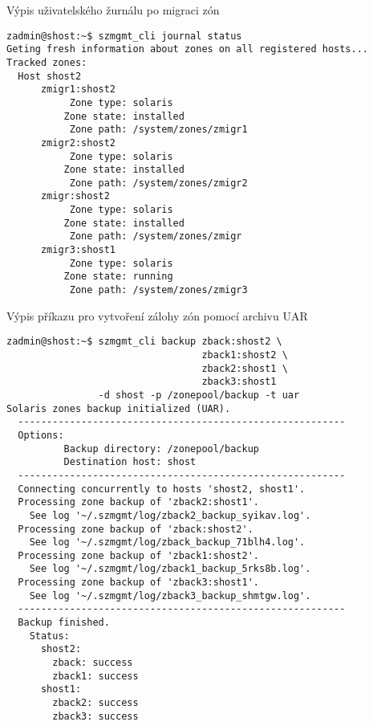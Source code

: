 \begin{listing}[ht]
  \caption{Výpis uživatelského žurnálu po migraci zón}  
  \begin{verbatim}
zadmin@shost:~$ szmgmt_cli journal status
Geting fresh information about zones on all registered hosts...
Tracked zones:  
  Host shost2
      zmigr1:shost2
           Zone type: solaris
          Zone state: installed
           Zone path: /system/zones/zmigr1
      zmigr2:shost2
           Zone type: solaris
          Zone state: installed
           Zone path: /system/zones/zmigr2
      zmigr:shost2
           Zone type: solaris
          Zone state: installed
           Zone path: /system/zones/zmigr  
      zmigr3:shost1
           Zone type: solaris
          Zone state: running
           Zone path: /system/zones/zmigr3
  \end{verbatim}
  \label{code:test:migration:after}
\end{listing}


\begin{listing}[ht]
  \caption{Výpis příkazu pro vytvoření zálohy zón pomocí archivu UAR}  
  \begin{verbatim}
zadmin@shost:~$ szmgmt_cli backup zback:shost2 \
                                  zback1:shost2 \
                                  zback2:shost1 \
                                  zback3:shost1
                -d shost -p /zonepool/backup -t uar
Solaris zones backup initialized (UAR).
  ---------------------------------------------------------
  Options:
          Backup directory: /zonepool/backup
          Destination host: shost
  ---------------------------------------------------------
  Connecting concurrently to hosts 'shost2, shost1'.
  Processing zone backup of 'zback2:shost1'. 
    See log '~/.szmgmt/log/zback2_backup_syikav.log'.
  Processing zone backup of 'zback:shost2'. 
    See log '~/.szmgmt/log/zback_backup_71blh4.log'.
  Processing zone backup of 'zback1:shost2'. 
    See log '~/.szmgmt/log/zback1_backup_5rks8b.log'.
  Processing zone backup of 'zback3:shost1'. 
    See log '~/.szmgmt/log/zback3_backup_shmtgw.log'.
  ---------------------------------------------------------
  Backup finished.
    Status:
      shost2:
        zback: success
        zback1: success
      shost1:
        zback2: success
        zback3: success
  \end{verbatim}
  \label{code:test:backup}
\end{listing}

